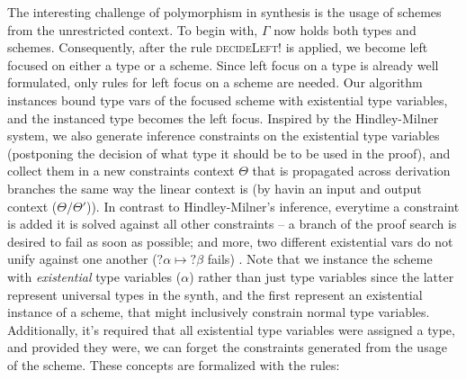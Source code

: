 \documentclass{llncs}
\def\Rho{P}
\begin{document}
The interesting challenge of polymorphism in synthesis is the usage of
schemes from the unrestricted context.  To begin with, $\Gamma$ now
holds both types and schemes. Consequently, after the rule
\textsc{decideLeft!} is applied, we become left focused on either a
type or a scheme. Since left focus on a type is already well
formulated, only rules for left focus on a scheme are needed. Our
algorithm instances bound type vars of the focused scheme with
existential type variables, and the instanced type becomes the left
focus. Inspired by the Hindley-Milner system, we also generate
inference constraints on the existential type variables (postponing
the decision of what type it should be to be used in the proof), and
collect them in a new constraints context $\Theta$ that is propagated
across derivation branches the same way the linear context is (by
havin an input and output context ($\Theta/\Theta'$)).  In contrast to
Hindley-Milner's inference, everytime a constraint is added it is solved against all other
constraints -- a branch of the proof search is desired to fail as soon
as possible; and more, two different existential vars do not unify
against one another ($?\alpha \mapsto ?\beta$ fails) . Note that we
instance the scheme with \emph{existential} type variables ($\alpha$)
rather than just type variables since the latter represent universal
types in the synth, and the first represent an existential instance of
a scheme, that might inclusively constrain normal type
variables. Additionally, it's required that all existential type
variables were assigned a type, and provided they were, we can forget
the constraints generated from the usage of the scheme. These concepts
are formalized with the rules:
\end{document}
